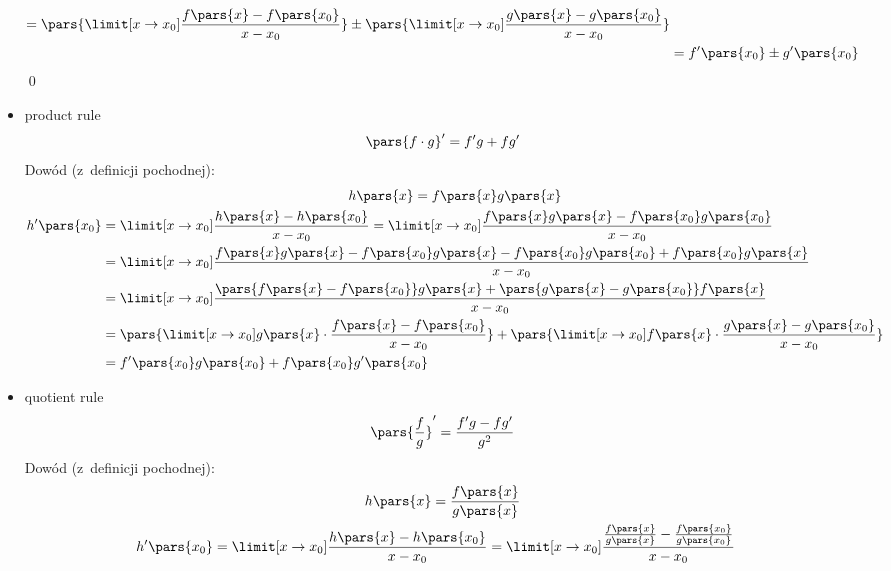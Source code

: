 \begin{itemize}
\begin{gather*}
\begin{split}
                    = \pars{\limit[x \to x_0] \frac{f\pars{x} - f\pars{x_0}}{x - x_0}} \pm \pars{\limit[x \to x_0] \frac{g\pars{x} - g\pars{x_0}}{x - x_0}}\\
                    &= f'\pars{x_0} \pm g'\pars{x_0}
            \end{split}
        \end{gather*}
        \qed
    \item product rule
        \begin{equation*}
            \pars{f \cdot g}' = f'g + fg'
        \end{equation*}
        Dowód (z~definicji pochodnej):
        \begin{gather*}
            h\pars{x} = f\pars{x}g\pars{x}\\
            \begin{split}
                h'\pars{x_0}
                    &= \limit[x \to x_0] \frac{h\pars{x} - h\pars{x_0}}{x - x_0}
                    = \limit[x \to x_0] \frac{f\pars{x}g\pars{x} - f\pars{x_0}g\pars{x_0}}{x - x_0}\\
                    &= \limit[x \to x_0] \frac{f\pars{x}g\pars{x} - f\pars{x_0}g\pars{x} - f\pars{x_0}g\pars{x_0} + f\pars{x_0}g\pars{x}}{x - x_0}\\
                    &= \limit[x \to x_0] \frac{\pars{f\pars{x} - f\pars{x_0}}g\pars{x} + \pars{g\pars{x} - g\pars{x_0}}f\pars{x}}{x - x_0}\\
                    &= \pars{\limit[x \to x_0] g\pars{x} \cdot \frac{f\pars{x} - f\pars{x_0}}{x - x_0}} + \pars{\limit[x \to x_0] f\pars{x} \cdot \frac{g\pars{x} - g\pars{x_0}}{x - x_0}}\\
                    &= f'\pars{x_0}g\pars{x_0} + f\pars{x_0}g'\pars{x_0}
            \end{split}
        \end{gather*}
    \item quotient rule
        \begin{equation*}
            \pars{\frac{f}{g}}' = \frac{f'g - fg'}{g^2}
        \end{equation*}
        Dowód (z~definicji pochodnej):
        \begin{gather*}
            h\pars{x} = \frac{f\pars{x}}{g\pars{x}}\\
            \begin{split}
                h'\pars{x_0}
                    &= \limit[x \to x_0] \frac{h\pars{x} - h\pars{x_0}}{x - x_0}
                    = \limit[x \to x_0] \frac{\frac{f\pars{x}}{g\pars{x}} - \frac{f\pars{x_0}}{g\pars{x_0}}}{x - x_0}

\end{split}
\end{gather*}
\end{itemize}
